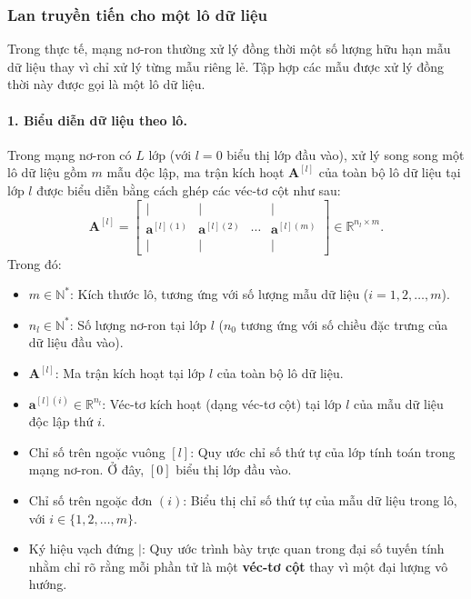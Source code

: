 \subsubsection{Lan truyền tiến cho một lô dữ liệu}
Trong thực tế, mạng nơ-ron thường xử lý đồng thời một số lượng hữu hạn mẫu dữ liệu thay vì chỉ xử lý từng mẫu riêng lẻ. Tập hợp các mẫu được xử lý đồng thời này được gọi là một lô dữ liệu. 
\paragraph{1. Biểu diễn dữ liệu theo lô.\\}
Trong mạng nơ-ron có $L$ lớp (với $l=0$ biểu thị lớp đầu vào), xử lý song song một lô dữ liệu gồm $m$ mẫu độc lập, ma trận kích hoạt $\mathbf{A}^{[l]}$ của toàn bộ lô dữ liệu tại lớp $l$ được biểu diễn bằng cách ghép các véc-tơ cột như sau:
\begin{equation}
    \mathbf{A}^{[l]} =
    \begin{bmatrix}
        \Big| & \Big| & & \Big| \\
        \mathbf{a}^{[l](1)} & \mathbf{a}^{[l](2)} & \cdots & \mathbf{a}^{[l](m)} \\
        \Big| & \Big| & & \Big|
    \end{bmatrix}
    \in \mathbb{R}^{n_l \times m}.
    \label{eq:ma_tran_kich_hoat_tong_quat}
\end{equation}
Trong đó:
\begin{itemize}
    \item $m \in \mathbb{N}^*$: Kích thước lô, tương ứng với số lượng mẫu dữ liệu ($i = 1, 2, \dots, m$).
    \item $n_l \in \mathbb{N}^*$: Số lượng nơ-ron tại lớp $l$ ($n_0$ tương ứng với số chiều đặc trưng của dữ liệu đầu vào).
    \item $\mathbf{A}^{[l]}$: Ma trận kích hoạt tại lớp $l$ của toàn bộ lô dữ liệu.
    \item $\mathbf{a}^{[l](i)} \in \mathbb{R}^{n_l}$: Véc-tơ kích hoạt (dạng véc-tơ cột) tại lớp $l$ của mẫu dữ liệu độc lập thứ $i$.
    \item Chỉ số trên ngoặc vuông $[l]$: Quy ước chỉ số thứ tự của lớp tính toán trong mạng nơ-ron. Ở đây, $[0]$ biểu thị lớp đầu vào.
    \item Chỉ số trên ngoặc đơn $(i)$: Biểu thị chỉ số thứ tự của mẫu dữ liệu trong lô, với $i \in \{1, 2, \dots, m\}$.
    \item Ký hiệu vạch đứng $\Big|$: Quy ước trình bày trực quan trong đại số tuyến tính nhằm chỉ rõ rằng mỗi phần tử là một \textbf{véc-tơ cột} thay vì một đại lượng vô hướng. 
\end{itemize}

